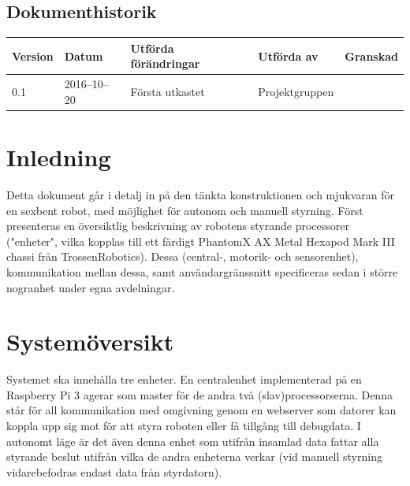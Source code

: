 \documentclass[a4paper,titlepage,12pt]{article}
\begin{document}
\begin{center}

		\section*{Dokumenthistorik}
		\renewcommand*{\arraystretch}{1.4}
		\begin{longtable}[c]{ l l l l l }
			\textbf{Version} & \textbf{Datum} & \textbf{Utförda förändringar} 
			& \textbf{Utförda av} & \textbf{Granskad} \\ \midrule
			
			0.1 & 2016--10--20 & Första utkastet & Projektgruppen & \\
		\end{longtable}
	\end{center}


	\newpage

	\section{Inledning}
	Detta dokument går i detalj in på den tänkta konstruktionen och mjukvaran för en 
	sexbent robot, med möjlighet för autonom och manuell styrning. Först presenteras en 
	översiktlig beskrivning av robotens styrande processorer ("enheter", vilka kopplas till ett färdigt 
	PhantomX AX Metal Hexapod Mark III chassi från TrossenRobotics). Dessa (central-, 
	motorik- och sensorenhet), kommunikation mellan dessa, samt användargränssnitt specificeras 
	sedan i större nogranhet under egna avdelningar.


	\section{Systemöversikt}
	Systemet ska innehålla tre enheter. En centralenhet implementerad på en Raspberry Pi 3 
	agerar som master för de andra två (slav)processorserna. Denna står för all kommunikation 
	med omgivning genom en webserver som datorer kan koppla upp sig mot för att styra roboten 
	eller få tillgång till debugdata. I autonomt läge är det även denna enhet som utifrån 
	insamlad data fattar alla styrande beslut utifrån vilka de andra enheterna verkar (vid 
	manuell styrning vidarebefodras endast data från styrdatorn).
\end{document}
